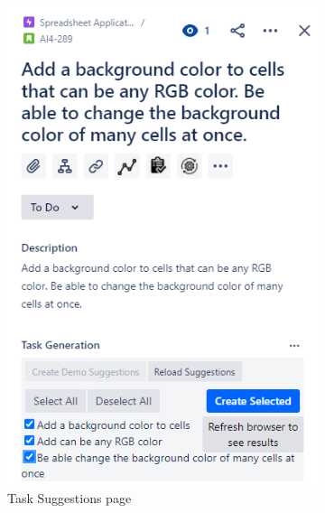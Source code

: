\begin{figure}
\begin{subfigure}{.5\textwidth}
\centering
\includegraphics[width=.8\linewidth,keepaspectratio]{./figure/Scenario1Figure4.png}
\caption{Task Suggestions page}
\label{fig:Scenario1Figure4}
\end{subfigure}
\begin{subfigure}{.5\textwidth}
\centering

\end{subfigure}
\end{figure}

